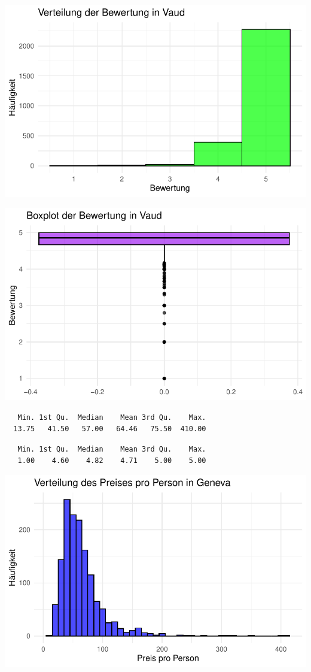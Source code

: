 \documentclass[
  journal,
]{IEEEtran}%
\begin{document}
\includegraphics{main_files/figure-pdf/unnamed-chunk-9-3.pdf}

\includegraphics{main_files/figure-pdf/unnamed-chunk-9-4.pdf}

\begin{verbatim}
   Min. 1st Qu.  Median    Mean 3rd Qu.    Max. 
  13.75   41.50   57.00   64.46   75.50  410.00 
\end{verbatim}

\begin{verbatim}
   Min. 1st Qu.  Median    Mean 3rd Qu.    Max. 
   1.00    4.60    4.82    4.71    5.00    5.00 
\end{verbatim}

\includegraphics{main_files/figure-pdf/unnamed-chunk-10-1.pdf}
\end{document}
